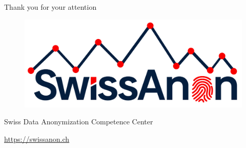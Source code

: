 \documentclass[
	aspectratio = 169
 ]{beamer}
\begin{document}
\begin{frame}[plain]

\centering
\Huge Thank you for your attention\\

  \vspace{2em}

  \begin{figure}
      \centering
      \includegraphics[width=0.5\linewidth]{style/SwissAnon.png}
  \end{figure}

\large Swiss Data Anonymization Competence Center

\href{https://swissanon.ch}{\color{blue}\underline{https://swissanon.ch}}
\end{frame}

\end{document}
